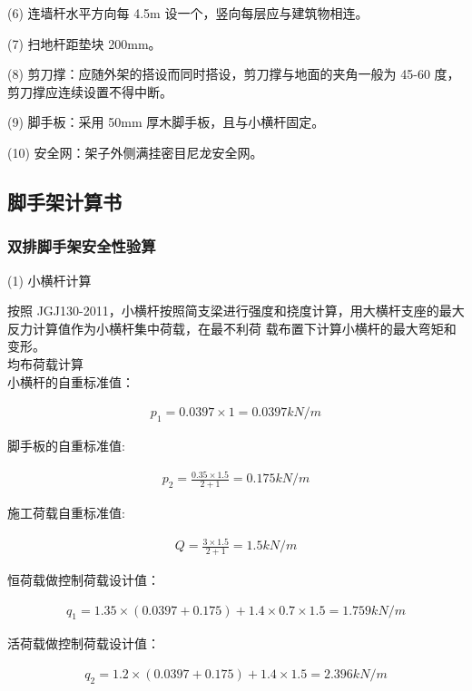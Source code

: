 (6) 连墙杆水平方向每 4.5m 设一个，竖向每层应与建筑物相连。

(7) 扫地杆距垫块 200mm。

(8) 剪刀撑：应随外架的搭设而同时搭设，剪刀撑与地面的夹角一般为 45-60 度，
剪刀撑应连续设置不得中断。

(9) 脚手板：采用 50mm 厚木脚手板，且与小横杆固定。

(10) 安全网：架子外侧满挂密目尼龙安全网。

\subsection{脚手架计算书}
\subsubsection{双排脚手架安全性验算}

(1) 小横杆计算

按照 JGJ130-2011，小横杆按照简支梁进行强度和挠度计算，用大横杆支座的最大反力计算值作为小横杆集中荷载，在最不利荷
载布置下计算小横杆的最大弯矩和变形。\\

 均布荷载计算\\

小横杆的自重标准值：

\begin{align}
    p_1=0.0397 \times 1=0.0397 kN/m
\end{align}

脚手板的自重标准值:

\begin{align}
    p_2=\frac{0.35 \times 1.5}{2+1}=0.175 kN/m
\end{align}

施工荷载自重标准值:

\begin{align}
    Q=\frac{3 \times 1.5}{2+1}=1.5 kN/m
\end{align}

恒荷载做控制荷载设计值：

\begin{align}
    q_1=1.35\times(0.0397+0.175)+1.4\times 0.7\times 1.5=1.759 kN/m
\end{align}

活荷载做控制荷载设计值：

\begin{align}
    q_2=1.2\times(0.0397+0.175)+1.4\times 1.5=2.396 kN/m
\end{align}

